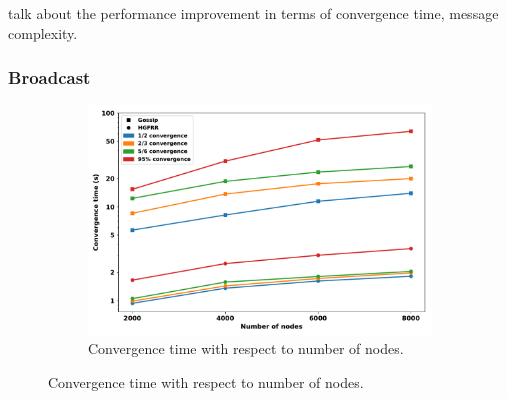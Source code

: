 talk about the performance improvement in terms of convergence time, message complexity.

\subsubsection{Broadcast}

\begin{figure}[ht]
  \centering
    \begin{subfigure}[b]{0.46\textwidth}
	  \includegraphics[width=\textwidth]{figures/hgfr_ourgossip_cvgtime_on_num_nodes.pdf}
	  \caption{Convergence time with respect to number of nodes.}
	  \label{hgfr_ourgossip_cvgtime_on_num_nodes}
    \end{subfigure}


\end{figure}

